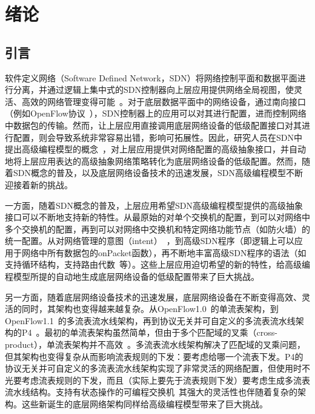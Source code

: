 \chapter{绪论}

\section{引言}

软件定义网络（Software Defined Network，SDN）将网络控制平面和数据平面进行分离，并通过逻辑上集中式的SDN控制器向上层应用提供网络全局视图，使灵活、高效的网络管理变得可能~\cite{mckeown2008openflow,feamster2013road,b4}。对于底层数据平面中的网络设备，通过南向接口（例如OpenFlow协议~\cite{mckeown2008openflow}），SDN控制器上的应用可以对其进行配置，进而控制网络中数据包的传输。然而，让上层应用直接调用底层网络设备的低级配置接口对其进行配置，则会导致系统非常容易出错，影响可拓展性。因此，研究人员在SDN中提出高级编程模型的概念~\cite{foster2011frenetic,maple,reich2013modular}，对上层应用提供对网络配置的高级抽象接口，并自动地将上层应用表达的高级抽象网络策略转化为底层网络设备的低级配置。然而，随着SDN概念的普及，以及底层网络设备技术的迅速发展，SDN高级编程模型不断迎接着新的挑战。

一方面，随着SDN概念的普及，上层应用希望SDN高级编程模型提供的高级抽象接口可以不断地支持新的特性。从最原始的对单个交换机的配置，到可以对网络中多个交换机的配置，再到可以对网络中交换机和特定网络功能节点（如防火墙）的统一配置。从对网络管理的意图（intent）~\cite{berde2014onos}，到高级SDN程序（即逻辑上可以应用于网络中所有数据包的onPacket函数），再不断地丰富高级SDN程序的语法（如支持循环结构，支持路由代数~\cite{gao2018t}等）。这些上层应用迫切希望的新的特性，给高级编程模型所提的自动地生成底层网络设备的低级配置带来了巨大挑战。

另一方面，随着底层网络设备技术的迅速发展，底层网络设备在不断变得高效、灵活的同时，其架构也变得越来越复杂。从OpenFlow1.0~\cite{openflow1}的单流表架构，到OpenFlow1.1~\cite{openflow1-1}的多流表流水线架构，再到协议无关并可自定义的多流表流水线架构的P4~\cite{P4}。最初的单流表架构虽然简单，但由于多个匹配域的叉乘（cross-product），单流表架构并不高效~\cite{openflow1-3-1}。多流表流水线架构解决了匹配域的叉乘问题，但其架构也变得复杂从而影响流表规则的下发：要考虑给哪一个流表下发。P4的协议无关并可自定义的多流表流水线架构实现了非常灵活的网络配置，但使用时不光要考虑流表规则的下发，而且（实际上要先于流表规则下发）要考虑生成多流表流水线结构。支持有状态操作的可编程交换机~\cite{moshref2014flow,bianchi2014openstate}其强大的灵活性也伴随着复杂的架构。这些新诞生的底层网络架构同样给高级编程模型带来了巨大挑战。

